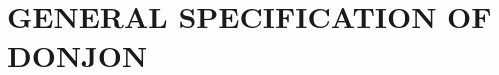 \section{GENERAL SPECIFICATION OF DONJON}\label{sect:gen}


\vskip 0.8cm

\vskip 0.8cm

\vskip 0.8cm

